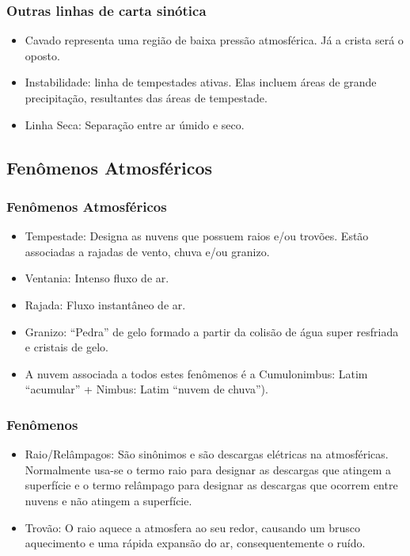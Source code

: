 \begin{frame}
\frametitle{Outras linhas de carta sinótica}
  \begin{itemize}[<+-| alert@+>]
    \item Cavado representa uma região de baixa pressão atmosférica.  Já a
          crista será o oposto.
    \item Instabilidade: linha de tempestades ativas.  Elas incluem áreas de
          grande precipitação, resultantes das áreas de tempestade.
    \item Linha Seca: Separação entre ar úmido e seco.
  \end{itemize}
\end{frame}


\subsection{Fenômenos Atmosféricos}
\begin{frame}
\frametitle{Fenômenos Atmosféricos}
  \begin{itemize}[<+-| alert@+>]
  \item Tempestade: Designa as nuvens que possuem raios e/ou trovões. Estão
        associadas a rajadas de vento, chuva e/ou granizo.
  \item Ventania: Intenso fluxo de ar.
  \item Rajada: Fluxo instantâneo de ar.
  \item Granizo: ``Pedra'' de gelo formado a partir da colisão de água super
        resfriada e cristais de gelo.
  \item A nuvem associada a todos estes fenômenos é a Cumulonimbus: Latim
        ``acumular'' + Nimbus: Latim ``nuvem de chuva'').
\end{itemize}
\end{frame}


\begin{frame}
\frametitle{Fenômenos}
  \begin{itemize}[<+-| alert@+>]
  \item Raio/Relâmpagos: São sinônimos e são descargas elétricas na
        atmosféricas.  Normalmente usa-se o termo raio para designar as
        descargas que atingem a superfície e o termo relâmpago para designar as
        descargas que ocorrem entre nuvens e não atingem a superfície.
  \item Trovão: O raio aquece a atmosfera ao seu redor, causando um brusco
        aquecimento e uma rápida expansão do ar, consequentemente o ruído.
\end{itemize}
\end{frame}


